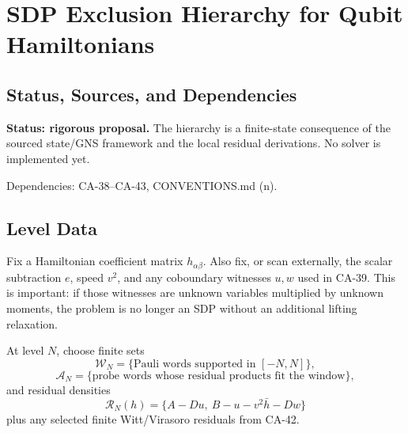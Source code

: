 
\section{SDP Exclusion Hierarchy for Qubit Hamiltonians}
\label{sec:qubit-sdp-exclusion-hierarchy}

\subsection{Status, Sources, and Dependencies}

\textbf{Status: rigorous proposal.}  The hierarchy is a finite-state
consequence of the sourced state/GNS framework and the local residual
derivations.  No solver is implemented yet.

Dependencies: CA-38--CA-43, CONVENTIONS.md (n).


\subsection{Level Data}

Fix a Hamiltonian coefficient matrix \(h_{\alpha\beta}\).  Also fix, or scan
externally, the scalar subtraction \(e\), speed \(v^2\), and any coboundary
witnesses \(u,w\) used in CA-39.  This is important: if those witnesses are
unknown variables multiplied by unknown moments, the problem is no longer an
SDP without an additional lifting relaxation.

At level \(N\), choose finite sets
\[
  \mathcal W_N=\{\text{Pauli words supported in }[-N,N]\},
\]
\[
  \mathcal A_N=\{\text{probe words whose residual products fit the window}\},
\]
and residual densities
\[
  \mathcal R_N(h)=
  \{A-Du,\ B-u-v^2\bar h-Dw\}
\]
plus any selected finite Witt/Virasoro residuals from CA-42.

